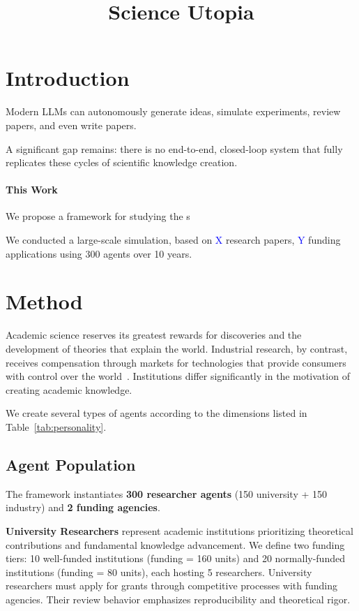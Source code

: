 \documentclass{article}
\title{Science Utopia}
\author{}
\date{}
\begin{document}
\maketitle

\section{Introduction}

Modern LLMs can autonomously generate ideas, simulate experiments, review papers, and even write papers. 

A significant gap remains: there is no end-to-end, closed-loop system that fully replicates these cycles of scientific knowledge creation.

\paragraph{This Work} 
We propose a framework for studying the s

We conducted a large-scale simulation, based on \textcolor{blue}{X} research papers, \textcolor{blue}{Y} funding applications using 300 agents over 10 years.

\section{Method}

Academic science reserves its greatest rewards for discoveries and the
development of theories that explain the world. Industrial research, by
contrast, receives compensation through markets for technologies that
provide consumers with control over the world~\cite{fleming2001technology, evans2010industry}. Institutions differ significantly in the motivation of creating academic knowledge.

We create several types of agents according to the dimensions listed in Table~\ref{tab:personality}.

\subsection{Agent Population}

The framework instantiates \textbf{300 researcher agents} (150 university + 150 industry) and \textbf{2 funding agencies}.

\noindent \textbf{University Researchers} represent academic institutions prioritizing theoretical contributions and fundamental knowledge advancement. We define two funding tiers: 10 well-funded institutions (funding = 160 units) and 20 normally-funded institutions (funding = 80 units), each hosting 5 researchers. University researchers must apply for grants through competitive processes with funding agencies. Their review behavior emphasizes reproducibility and theoretical rigor.
\end{document}
